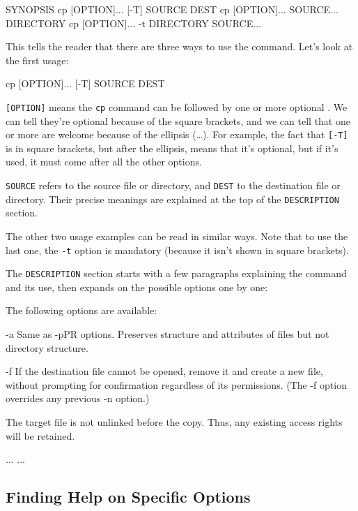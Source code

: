 \begin{VerbOut}
SYNOPSIS
   cp [OPTION]... [-T] SOURCE DEST
   cp [OPTION]... SOURCE... DIRECTORY
   cp [OPTION]... -t DIRECTORY SOURCE...
\end{VerbOut}

This tells the reader that there are three ways to use the command.
Let's look at the first usage:

\begin{VerbOut}
cp [OPTION]... [-T] SOURCE DEST
\end{VerbOut}

\texttt{{[}OPTION{]}} means the \texttt{cp} command can be followed by
one or more optional . We can tell
they're optional because of the square brackets, and we can tell that
one or more are welcome because of the ellipsis (\ldots{}). For example,
the fact that \texttt{{[}-T{]}} is in square brackets, but after the
ellipsis, means that it's optional, but if it's used, it must come after
all the other options.

\texttt{SOURCE} refers to the source file or directory, and
\texttt{DEST} to the destination file or directory. Their precise
meanings are explained at the top of the \texttt{DESCRIPTION} section.

The other two usage examples can be read in similar ways. Note that to
use the last one, the \texttt{-t} option is mandatory (because it isn't
shown in square brackets).

The \texttt{DESCRIPTION} section starts with a few paragraphs explaining
the command and its use, then expands on the possible options one by
one:

\begin{VerbOut}
     The following options are available:

     -a    Same as -pPR options. Preserves structure and attributes of
           files but not directory structure.

     -f    If the destination file cannot be opened, remove it and create
           a new file, without prompting for confirmation regardless of
           its permissions.  (The -f option overrides any previous -n
           option.)

           The target file is not unlinked before the copy.  Thus, any
           existing access rights will be retained.

      ...  ...
\end{VerbOut}

\subsection*{Finding Help on Specific Options}

